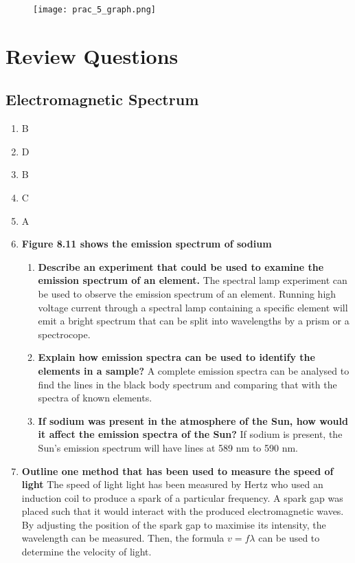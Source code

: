\documentclass{report}
\begin{document}
			\begin{figure}[H]
				\centering
				\texttt{[image: prac\_5\_graph.png]}
			\end{figure}

\newpage

\chapter{Review Questions}

	\section{Electromagnetic Spectrum}

		\begin{enumerate}
			\item B
			\item D
			\item B
			\item C
			\item A
			\item \textbf{Figure 8.11 shows the emission spectrum of sodium}
				\begin{enumerate}
					\item \textbf{Describe an experiment that could be used to examine the emission spectrum of an element.}
						\subitem The spectral lamp experiment can be used to observe the emission spectrum of an element. Running high voltage current through a spectral lamp containing a specific element will emit a bright spectrum that can be split into wavelengths by a prism or a spectrocope.

					\item \textbf{Explain how emission spectra can be used to identify the elements in a sample?}
						\subitem A complete emission spectra can be analysed to find the lines in the black body spectrum and comparing that with the spectra of known elements.

					\item \textbf{If sodium was present in the atmosphere of the Sun, how would it affect the emission spectra of the Sun?}
						\subitem If sodium is present, the Sun's emission spectrum will have lines at 589 nm to 590 nm.
				\end{enumerate}

				\item \textbf{Outline one method that has been used to measure the speed of light}
					\subitem The speed of light light has been measured by Hertz who used an induction coil to produce a spark of a particular frequency. A spark gap was placed such that it would interact with the produced electromagnetic waves. By adjusting the position of the spark gap to maximise its intensity, the wavelength can be measured. Then, the formula $v=f \lambda$ can be used to determine the velocity of light.


\end{enumerate}
\end{document}
